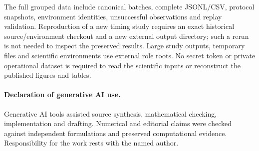 The full grouped data include canonical batches, complete JSONL/CSV,
protocol snapshots, environment identities, unsuccessful observations and
replay validation. Reproduction of a new timing study requires an exact
historical source/environment checkout and a new external output directory;
such a rerun is not needed to inspect the preserved results. Large study
outputs, temporary files and scientific environments use external role
roots. No secret token or private operational dataset is required to read
the scientific inputs or reconstruct the published figures and tables.

\paragraph{Declaration of generative AI use.}
Generative AI tools assisted source synthesis, mathematical checking,
implementation and drafting. Numerical and editorial claims were checked
against independent formulations and preserved computational evidence.
Responsibility for the work rests with the named author.
